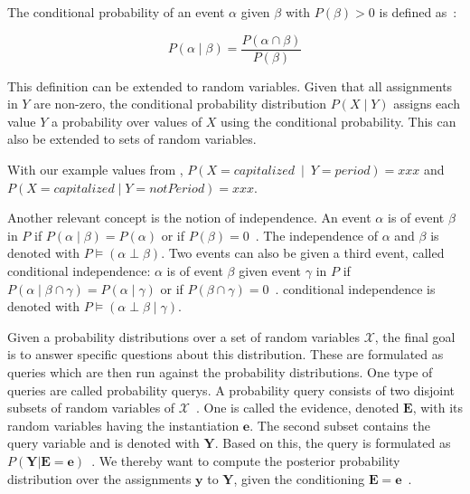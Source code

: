 \bigskip

The \gls{conditional probability} of an event $\alpha$ given $\beta$ with $P(\beta)>0$ is defined as~\cite{koller2009probabilistic}:

\begin{equation}
P(\alpha\mid\beta) = \frac{P(\alpha\cap\beta)}{P(\beta)}
\label{equ:conditional-probability}
\end{equation}

This definition can be extended to \glspl{random variable}.
Given that all assignments in $Y$ are non-zero, the \gls{conditional probability distribution} $P(X\mid Y)$ assigns each value $Y$ a probability over values of $X$ using the \gls{conditional probability}.
This can also be extended to sets of \glspl{random variable}.

With our example values from , $P(X=capitalized\ \mid\ Y=period)=xxx$ and $P(X=capitalized\mid Y=notPeriod)=xxx$.

\bigskip

Another relevant concept is the notion of \gls{independence}.
An \gls{event} $\alpha$ is  of \gls{event} $\beta$ in $P$ if $P(\alpha\mid\beta)=P(\alpha)$ or if $P(\beta)=0$~\cite{koller2009probabilistic}.
The \gls{independence} of $\alpha$ and $\beta$ is denoted with $P\models(\alpha\perp\beta)$.
Two \glspl{event} can also be  given a third \gls{event}, called \gls{conditional independence}:
$\alpha$ is  of \gls{event} $\beta$ given \gls{event} $\gamma$ in $P$ if $P(\alpha\mid\beta\cap\gamma)=P(\alpha\mid\gamma)$ or if $P(\beta\cap\gamma)=0$~\cite{koller2009probabilistic}.
\Gls{conditional independence} is denoted with $P\models(\alpha\perp\beta\mid\gamma)$.


Given a \glspl{probability distribution} over a set of \glspl{random variable} $\mathcal{X}$, the final goal is to answer specific questions about this distribution.
These are formulated as queries which are then run against the \glspl{probability distribution}.
One type of queries are called \glspl{probability query}.
A \gls{probability query} consists of two disjoint subsets of \glspl{random variable} of $\mathcal{X}$~\citep{koller2009probabilistic}.
One is called the \gls{evidence}, denoted $\bm{E}$, with its \glspl{random variable} having the instantiation $\bm{e}$.
The second subset contains the query variable and is denoted with $\bm{Y}$.
Based on this, the query is formulated as $P(\bm{Y}|\bm{E}=\bm{e})$~\citep{koller2009probabilistic}.
We thereby want to compute the posterior probability distribution over the assignments $\bm{y}$ to $\bm{Y}$, given the conditioning $\bm{E}=\bm{e}$~\citep{koller2009probabilistic}.

